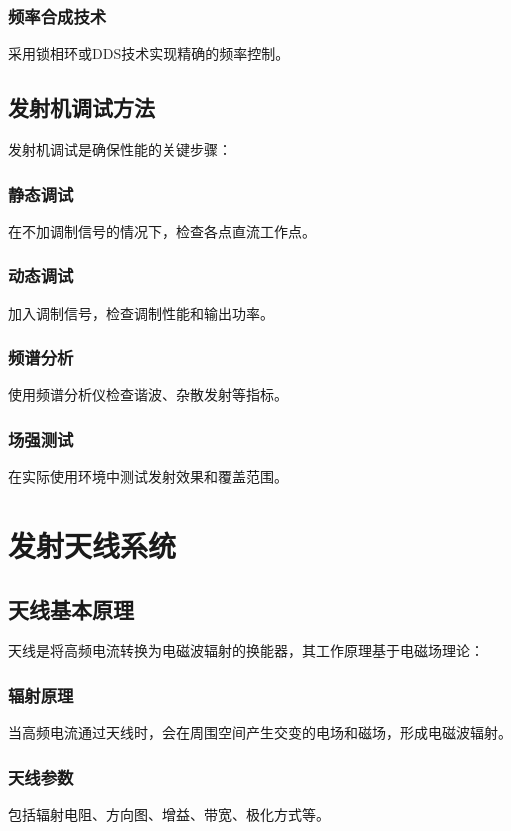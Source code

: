 \documentclass[12pt,UTF8]{ctexbook}
\begin{document}
\subsubsection{频率合成技术}
采用锁相环或DDS技术实现精确的频率控制。

\subsection{发射机调试方法}

发射机调试是确保性能的关键步骤：

\subsubsection{静态调试}
在不加调制信号的情况下，检查各点直流工作点。

\subsubsection{动态调试}
加入调制信号，检查调制性能和输出功率。

\subsubsection{频谱分析}
使用频谱分析仪检查谐波、杂散发射等指标。

\subsubsection{场强测试}
在实际使用环境中测试发射效果和覆盖范围。

\section{发射天线系统}

\subsection{天线基本原理}

天线是将高频电流转换为电磁波辐射的换能器，其工作原理基于电磁场理论：

\subsubsection{辐射原理}
当高频电流通过天线时，会在周围空间产生交变的电场和磁场，形成电磁波辐射。

\subsubsection{天线参数}
包括辐射电阻、方向图、增益、带宽、极化方式等。
\end{document}
